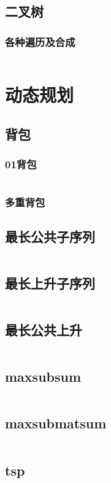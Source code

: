\documentclass[a4paper,11pt]{article}
\begin{document}
\subsection{二叉树}
\subsubsection{各种遍历及合成}
\inputminted[breaklines]{c++}{ds/bitree.cpp}

\section{动态规划}

\subsection{背包}
\subsubsection{01背包}	
\inputminted[breaklines]{c++}{dp/01bag.cpp}
\subsubsection{多重背包}
\subsection{最长公共子序列}
\inputminted[breaklines]{c++}{dp/lcs.cpp}

\subsection{最长上升子序列}
\inputminted[breaklines]{c++}{dp/lis.cpp}
\subsection{最长公共上升}
\inputminted[breaklines]{c++}{dp/lcis.cpp}
\subsection{maxsubsum}
\inputminted[breaklines]{c++}{dp/max_sub_sum.cpp}
\subsection{maxsubmatsum}
\inputminted[breaklines]{c++}{dp/max_sub_mat_sum.cpp}
\subsection{tsp}
\inputminted[breaklines]{c++}{dp/tsp.cpp}
\end{document}
